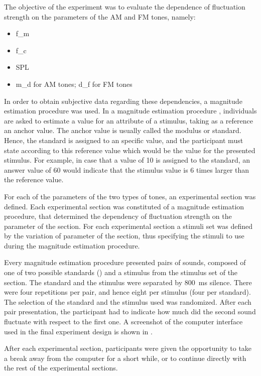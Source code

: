 \documentclass[../main.tex]{subfiles}
\begin{document}
The objective of the experiment was to evaluate the dependence of fluctuation
strength on the parameters of the \gls{AM} and \gls{FM} tones, namely:
\begin{itemize}
  \item \Gls{f_m}
  \item \Gls{f_c}
  \item \Gls{SPL}
  \item \Gls{m_d} for \gls{AM} tones; \gls{d_f} for \gls{FM} tones
\end{itemize}

In order to obtain subjective data regarding these dependencies, a magnitude
estimation procedure was used. In a magnitude estimation procedure
\cite[pp.~9]{Fastl2007Psychoacoustics}, individuals are asked to estimate a
value for an attribute of a stimulus, taking as a reference an anchor value.
The anchor value is usually called the modulus or standard. Hence, the standard
is assigned to an specific value, and the participant must state according to
this reference value which would be the value for the presented stimulus. For
example, in case that a value of 10 is assigned to the standard, an answer value
of 60 would indicate that the stimulus value is 6 times larger than the
reference value.

For each of the parameters of the two types of tones, an experimental section
was defined. Each experimental section was constituted of a magnitude estimation
procedure, that determined the dependency of fluctuation strength on the
parameter of the section. For each experimental section a stimuli set was
defined by the variation of parameter of the section, thus specifying the
stimuli to use during the magnitude estimation procedure.

Every magnitude estimation procedure presented pairs of sounds, composed of one
of two possible standards () and a stimulus from the
stimulus set of the section. The standard and the stimulus were separated by
800~ms silence. There were four repetitions per pair, and hence eight per
stimulus (four per standard). The selection of the standard and the stimulus
used was randomized. After each pair presentation, the participant had to
indicate how much did the second sound fluctuate with respect to the first one.
A screenshot of the computer interface used in the final experiment design is
shown in .

After each experimental section, participants were given the opportunity to
take a break away from the computer for a short while, or to continue directly
with the rest of the experimental sections.
\end{document}
